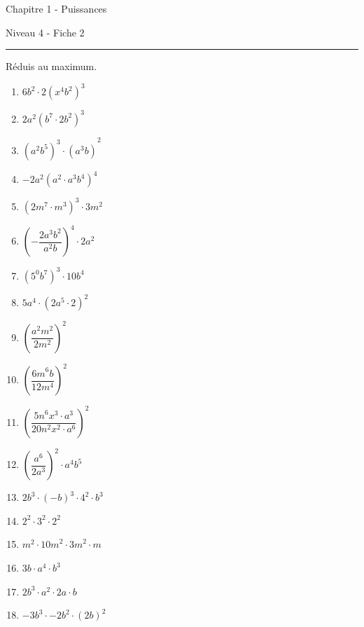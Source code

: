 \newpage
\begin{center}
  \bfseries
  \begin{Huge}
    Chapitre 1 - Puissances
  \end{Huge}
  \smallbreak
  \begin{large}
    Niveau 4  - Fiche 2
  \end{large}
  \smallbreak
  \rule[10pt]{.5\linewidth}{1 pt}
\end{center}

\setcounter{exercise}{0}

\begin{exercise}
  Réduis au maximum.
  \begin{enumerate}[cols=3]
    \item \(6b^{2} \cdot 2\left( x^{4}b^{2} \right)^{3} \)
    \item \({2a^{2}\left( b^{7} \cdot 2b^{2} \right)}^{3} \)
    \item \({\left( a^{2}b^{5} \right)^{3} \cdot \left( a^{3}b \right)}^{2} \)
    \item \({- 2a^{2}\left( a^{2} \cdot a^{3}b^{4} \right)}^{4} \)
    \item \(\left( 2m^{7} \cdot m^{3} \right)^{3} \cdot 3m^{2} \)
    \item \(\left( - \dfrac{2a^{3}b^{2}}{a^{2}b} \right)^{4} \cdot 2a^{2} \)
    \item \(\left( 5^{0}b^{7} \right)^{3} \cdot 10b^{4} \)
    \item \({5a^{4} \cdot \left( 2a^{5} \cdot 2 \right)}^{2} \)
    \item \(\left( \dfrac{a^{2}m^{2}}{2m^{2}} \right)^{2} \)
    \item \(\left( \dfrac{{6m}^{6}b}{12m^{4}} \right)^{2} \)
    \item \(\left( \dfrac{{5n}^{6}x^{3} \cdot a^{3}}{20n^{2}x^{2} \cdot a^{6}} \right)^{2} \)
    \item \(\left( \dfrac{a^{6}}{2a^{3}} \right)^{2} \cdot a^{4}b^{5} \)
    \item \({2b}^{3} \cdot ( - b)^{3} \cdot 4^{2} \cdot b^{3} \)
    \item \(2^{2} \cdot 3^{2} \cdot 2^{2} \)
    \item \(m^{2} \cdot {10m}^{2} \cdot {3m}^{2} \cdot m \)
    \item \(3b \cdot a^{4} \cdot b^{3} \)
    \item \({2b}^{3} \cdot a^{2} \cdot 2a \cdot b \)
    \item \(- {3b}^{3} \cdot {- 2b}^{2} \cdot (2b)^{2} \)
  \end{enumerate}
\end{exercise}


